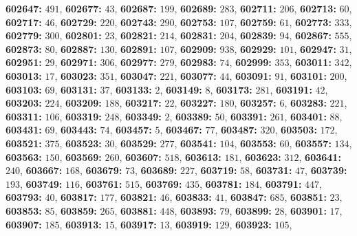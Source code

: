 \textsf{\bfseries 602647:} $491$, \textsf{\bfseries 602677:} $43$, \textsf{\bfseries 602687:} $199$, \textsf{\bfseries 602689:} $283$, \textsf{\bfseries 602711:} $206$, \textsf{\bfseries 602713:} $60$, \textsf{\bfseries 602717:} $46$, \textsf{\bfseries 602729:} $220$, \textsf{\bfseries 602743:} $290$, \textsf{\bfseries 602753:} $107$, \textsf{\bfseries 602759:} $61$, \textsf{\bfseries 602773:} $333$, \textsf{\bfseries 602779:} $300$, \textsf{\bfseries 602801:} $23$, \textsf{\bfseries 602821:} $214$, \textsf{\bfseries 602831:} $204$, \textsf{\bfseries 602839:} $94$, \textsf{\bfseries 602867:} $555$, \textsf{\bfseries 602873:} $80$, \textsf{\bfseries 602887:} $130$, \textsf{\bfseries 602891:} $107$, \textsf{\bfseries 602909:} $938$, \textsf{\bfseries 602929:} $101$, \textsf{\bfseries 602947:} $31$, \textsf{\bfseries 602951:} $29$, \textsf{\bfseries 602971:} $306$, \textsf{\bfseries 602977:} $279$, \textsf{\bfseries 602983:} $74$, \textsf{\bfseries 602999:} $353$, \textsf{\bfseries 603011:} $342$, \textsf{\bfseries 603013:} $17$, \textsf{\bfseries 603023:} $351$, \textsf{\bfseries 603047:} $221$, \textsf{\bfseries 603077:} $44$, \textsf{\bfseries 603091:} $91$, \textsf{\bfseries 603101:} $200$, \textsf{\bfseries 603103:} $69$, \textsf{\bfseries 603131:} $37$, \textsf{\bfseries 603133:} $2$, \textsf{\bfseries 603149:} $8$, \textsf{\bfseries 603173:} $281$, \textsf{\bfseries 603191:} $42$, \textsf{\bfseries 603203:} $224$, \textsf{\bfseries 603209:} $188$, \textsf{\bfseries 603217:} $22$, \textsf{\bfseries 603227:} $180$, \textsf{\bfseries 603257:} $6$, \textsf{\bfseries 603283:} $221$, \textsf{\bfseries 603311:} $106$, \textsf{\bfseries 603319:} $248$, \textsf{\bfseries 603349:} $2$, \textsf{\bfseries 603389:} $50$, \textsf{\bfseries 603391:} $261$, \textsf{\bfseries 603401:} $88$, \textsf{\bfseries 603431:} $69$, \textsf{\bfseries 603443:} $74$, \textsf{\bfseries 603457:} $5$, \textsf{\bfseries 603467:} $77$, \textsf{\bfseries 603487:} $320$, \textsf{\bfseries 603503:} $172$, \textsf{\bfseries 603521:} $375$, \textsf{\bfseries 603523:} $30$, \textsf{\bfseries 603529:} $277$, \textsf{\bfseries 603541:} $104$, \textsf{\bfseries 603553:} $60$, \textsf{\bfseries 603557:} $134$, \textsf{\bfseries 603563:} $150$, \textsf{\bfseries 603569:} $260$, \textsf{\bfseries 603607:} $518$, \textsf{\bfseries 603613:} $181$, \textsf{\bfseries 603623:} $312$, \textsf{\bfseries 603641:} $240$, \textsf{\bfseries 603667:} $168$, \textsf{\bfseries 603679:} $73$, \textsf{\bfseries 603689:} $227$, \textsf{\bfseries 603719:} $58$, \textsf{\bfseries 603731:} $47$, \textsf{\bfseries 603739:} $193$, \textsf{\bfseries 603749:} $116$, \textsf{\bfseries 603761:} $515$, \textsf{\bfseries 603769:} $435$, \textsf{\bfseries 603781:} $184$, \textsf{\bfseries 603791:} $447$, \textsf{\bfseries 603793:} $40$, \textsf{\bfseries 603817:} $177$, \textsf{\bfseries 603821:} $46$, \textsf{\bfseries 603833:} $41$, \textsf{\bfseries 603847:} $685$, \textsf{\bfseries 603851:} $23$, \textsf{\bfseries 603853:} $85$, \textsf{\bfseries 603859:} $265$, \textsf{\bfseries 603881:} $448$, \textsf{\bfseries 603893:} $79$, \textsf{\bfseries 603899:} $28$, \textsf{\bfseries 603901:} $17$, \textsf{\bfseries 603907:} $185$, \textsf{\bfseries 603913:} $15$, \textsf{\bfseries 603917:} $13$, \textsf{\bfseries 603919:} $129$, \textsf{\bfseries 603923:} $105$, 
